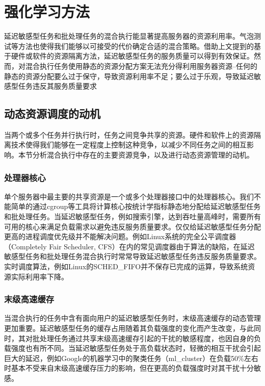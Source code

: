 \chapter{强化学习方法}
延迟敏感型任务和批处理任务的混合执行能显著提高服务器的资源利用率。气泡测试等方法也使得我们能够以可接受的代价确定合适的混合策略。借助上文提到的基于硬件或软件的资源隔离方法，延迟敏感型任务的服务质量可以得到有效保证。然而，对混合执行任务使用静态的资源分配方案无法充分得利用服务器资源\---任何的静态的资源分配要么过于保守，导致资源利用率不足；要么过于乐观，导致延迟敏感型任务违反其服务质量要求\cite{lo2015heracles}
\section{动态资源调度的动机}
当两个或多个任务并行执行时，任务之间竞争共享的资源。硬件和软件上的资源隔离技术使得我们能够在一定程度上控制这种竞争，以减少不同任务之间的相互影响。本节分析混合执行中存在的主要资源竞争，以及进行动态资源管理的动机。

\subsection{处理器核心}
单个服务器中最主要的共享资源是一个或多个处理器接口中的处理器核心。我们不能简单的通过cgroup等工具将计算核心按统计学指标静态地分配给延迟敏感型任务和批处理任务。当延迟敏感型任务，例如搜索引擎，达到吞吐量高峰时，需要所有可用的核心来满足负载需求以避免违反服务质量要求。仅仅给延迟敏感型任务分配更高的进程调度优先级并不能解决问题。例如Linux系统的完全公平调度器（Completely Fair Scheduler, CFS）在内的常见调度器由于算法的缺陷，在延迟敏感型任务和批处理任务混合执行时常常导致延迟敏感型任务违反服务质量要求\cite{leverich2014reconciling}。实时调度算法，例如Linux的SCHED\_FIFO并不保存已完成的运算，导致系统资源实际利用率下降。

\subsection{末级高速缓存}

当混合执行的任务中含有面向用户的延迟敏感型任务时，末级高速缓存的动态管理更加重要。延迟敏感型任务的缓存占用随着其负载强度的变化而产生改变\cite{leverich2014reconciling}，与此同时，其对批处理任务通过共享末级高速缓存引起的干扰的敏感程度，也因自身的负载强度也有所不同。当延迟敏感型任务处于高负载状态时，轻微的相互干扰会引起巨大的延迟\cite{kasture2014ubik}，例如Google的机器学习中的聚类任务（ml\_cluster）在负载50\%左右时基本不受来自末级高速缓存压力的影响，但在更高的负载强度时对其干扰十分敏感\cite{lo2015heracles}。

